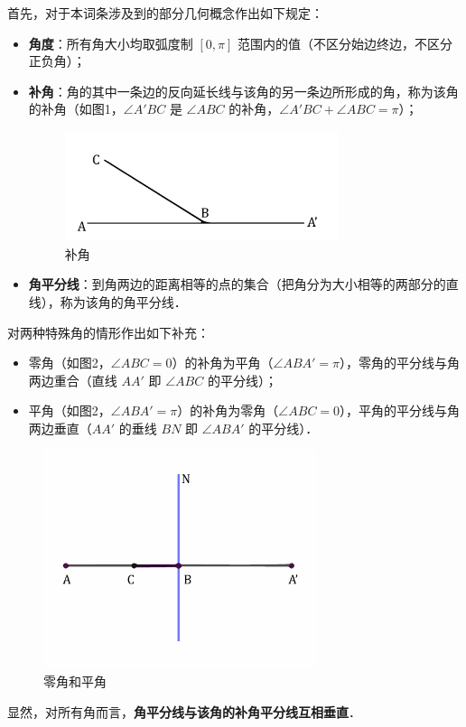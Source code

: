 

首先，对于本词条涉及到的部分几何概念作出如下规定：
\begin{itemize}
\item \textbf{角度}：所有角大小均取弧度制 $[0,\pi]$ 范围内的值（不区分始边终边，不区分正负角）；
\item \textbf{补角}：角的其中一条边的反向延长线与该角的另一条边所形成的角，称为该角的补角（如图1，$\angle A'BC$ 是 $\angle ABC$ 的补角，$\angle A'BC + \angle ABC = \pi$）；
\begin{figure}[ht]
\centering
\includegraphics[width=8cm]{./figures/ConOpt1.pdf}
\caption{补角} \label{ConOpt_fig1}
\end{figure}
\item \textbf{角平分线}：到角两边的距离相等的点的集合（把角分为大小相等的两部分的直线），称为该角的角平分线．
\end{itemize}
对两种特殊角的情形作出如下补充：
\begin{itemize}
\item 零角（如图2，$\angle ABC = 0$）的补角为平角（$\angle ABA' = \pi$），零角的平分线与角两边重合（直线 $AA'$ 即 $\angle ABC$ 的平分线）；
\item 平角（如图2，$\angle ABA' = \pi$）的补角为零角（$\angle ABC = 0$），平角的平分线与角两边垂直（$AA'$ 的垂线 $BN$ 即 $\angle ABA'$ 的平分线）．
\end{itemize}
\begin{figure}[ht]
\centering
\includegraphics[width=8cm]{./figures/ConOpt2.pdf}
\caption{零角和平角} \label{ConOpt_fig2}
\end{figure}
显然，对所有角而言，\textbf{角平分线与该角的补角平分线互相垂直}．

